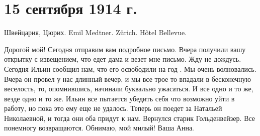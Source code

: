 \section{15 сентября 1914 г.}


Швейцария, Цюрих.
Emil Medtner.
Zürich.
Hôtel Bellevue.


Дорогой мой! Сегодня отправим вам подробное письмо. Вчера получили вашу
открытку с извещением, что едет дама и везет мне письмо. Жду не дождусь.
Сегодня Ильин сообщил нам, что его освободили на год . Мы очень
волновались. Вчера он провел у нас длинный вечер, и мы все трое то впадали в
бесконечную веселость, то, опомнившись, начинали буквально ужасаться. И все
одно и то же, везде одно и то же. Ильин все пытается убедить себя что возможно
уйти в работу, но пока это ему еще не удалось. Теперь он поедет за Натальей
Николаевной, и тогда они оба придут к нам. Вернулся старик Гольденвейзер. Все
понемногу возвращаются. Обнимаю, мой милый! Ваша Анна.

